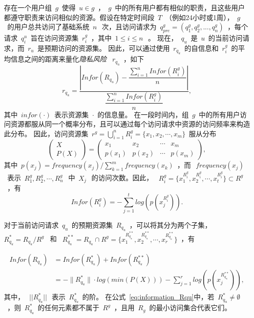 存在一个用户组~$g$~使得~$u \in g$~，~$g$~中的所有用户都有相似的职责，且这些用户都遵守职责来访问相似的资源。假设在特定时间段~$T$~（例如24小时或1周），~$g$~的用户总共访问了基础系统~$n~$~次，且访问请求为~$q^g_{pre}=(q^g_1,q^g_2,...,q^g_n)$~，每个请求~$q^u_i$~旨在访问资源集~$r^g_i$~，其中~$1 \leq i \leq n~$~。
现在，~$q_u$~是~$u$~的当前访问请求，而~$r_u$~是预期访问的资源集。 因此，可以通过使用~$r_{q_u}$~的自信息和~$r^g_i$~的平均信息之间的距离来量化\emph{隐私风险} ~$r_{q_u}$~，如下
\begin{equation}\label{eq:privacy_risk_qu}
r_{q_u} = \dfrac{|Infor(R_{q_u})-\dfrac{\sum ^{n}_{i=1} Infor(R^g_i)}{n}|}{\dfrac{\sum ^{n}_{i=1} Infor(R^g_i)}{n}}, 
\end{equation}
其中~$infor(\cdot)$~表示资源集~$\cdot$~的信息量。 在一段时间内，组~$g$~中的所有用户访问资源都服从同一个概率分布，且可以通过每个访问请求中资源的访问频率来构造此分布。 因此，访问资源集~$r^g = \bigcup _{i=1}^n R^g_i=\{x_1, x_2, \cdots, x_m\}$~服从分布
\begin{equation}\label{eq:distribution_Rg}
\left(
\begin{array}{c}
X \\ P(X)
\end{array}
\right)
=\left(
\begin{array}{cccccccccc}
x_1 &  x_2 & \cdots & x_m
\\ p(x_1) &  p(x_2) & \cdots & p(x_m)
\end{array}
\right),
\end{equation}
其中~$p(x_j)=frequency(x_j)/\sum_{k=1}^m frequency(x_k)$~，而~$~frequency(x_j)$~表示~$R^g_1, R^g_2, \cdots, R^g_n~$~中~$X_j~$~的访问次数。因此， ~$R^g_i =\{x_1^{R^g_i},x_2^{R^g_i},\cdots, x_t^{R^g_i}\} \subset R^g$~，有
\begin{equation}\label{eq:information_Rgi}
Infor(R^g_i)=-\sum_{j=1}^t log(p(x_j^{R^g_i})).
\end{equation}

对于当前访问请求~$q_u$~的预期资源集~$R_{q_u}$~，可以将其分为两个子集， ~$R_{q_u}^* = R_{q_u}/R^g$~ 和 ~$R_{q_u}^{**} = R_{q_u} \cap R^g = \{x_1^{R_{q_u}^{**}},x_2^{R_{q_u}^{**}},\cdots, x_r^{R_{q_u}^{**}}\}$~，有

\begin{equation}\label{eq:information_Rqu}
\begin{split}
Infor(R_{q_u})&=Infor(R_{q_u}^{*})  +Infor(R_{q_u}^{**})
\\&=-\|R_{q_u}^*\|\cdot log(min(P(X)))-\sum_{j=1}^r log(p(x_j^{R_{q_u}^{**}})),
\end{split}
\end{equation}
其中，~$~||R_{q_u}^*||~$~表示~$R_{q_u}^*$~的阶。 在公式~\ref{eq:information_Rqu}中，若~$R_{q_u}^* \neq \emptyset$~，则~$R_{q_u}^*$~的任何元素都不属于~$R^g$~，且用~$R_g$~的最小访问集合代表它们。

